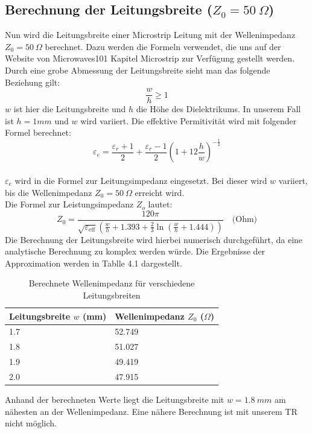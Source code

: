     \subsection{\texorpdfstring{Berechnung der Leitungsbreite ($Z_0 = 50~\Omega$)}{Berechnung der Leitungsbreite (Z0 = 50 Ohm)}}
    Nun wird die Leitungsbreite einer Microstrip Leitung mit der Wellenimpedanz $Z_0 = 50~\Omega$ berechnet.
    Dazu werden die Formeln verwendet, die uns auf der Website von Microwaves101 Kapitel Microstrip zur
    Verfügung gestellt werden. Durch eine grobe Abmessung der Leitungsbreite sieht man das folgende Beziehung gilt: \\
    \[
    \frac{w}{h} \geq 1
    \]
    $w$ ist hier die Leitungsbreite und $h$ die Höhe des Dielektrikums. In unserem Fall ist $h = 1mm$ und $w$ wird variiert. Die 
    effektive Permitivität wird mit folgender Formel berechnet:
      \[
    \varepsilon_e = \frac{\varepsilon_r + 1}{2} + \frac{\varepsilon_r - 1}{2} \left( 1 + 12 \frac{h}{w} \right)^{-\frac{1}{2}}
    \]
   \\ $\varepsilon_e$ wird in die Formel zur Leitungsimpedanz eingesetzt. Bei dieser wird $w$
    variiert, bis die Wellenimpedanz $Z_0 = 50~\Omega$ erreicht wird.
    \\
    Die Formel zur Leistungsimpedanz $Z_o$ lautet:
    \[
    Z_0 = \frac{120 \pi}{\sqrt{\varepsilon_{\text{eff}}} \left( \frac{w}{h} + 1.393 + \frac{2}{3} \ln\left( \frac{w}{h} + 1.444 \right) \right)} \quad \text{(Ohm)}
    \]
    Die Berechnung der Leitungsbreite wird hierbei numerisch durchgeführt, da eine analytische Berechnung zu
    komplex werden würde. Die Ergebnisse der Approximation werden in Tablle 4.1 dargestellt. \\
    
    \begin{table}[H]
        \centering
        \begin{tabular}{|l|l|}
            \hline
            \textbf{Leitungsbreite $w$ (mm)} & \textbf{Wellenimpedanz $Z_0$ ($\Omega$)} \\
            \hline
            1.7 & 52.749 \\
            1.8 & 51.027 \\
            1.9 & 49.419 \\
            2.0 & 47.915 \\
           
            \hline
        \end{tabular}
        \caption{Berechnete Wellenimpedanz für verschiedene Leitungsbreiten}
    \end{table}
    Anhand der berechneten Werte liegt die Leitungsbreite mit $w = 1.8~mm$ am nähesten an der Wellenimpedanz.
    Eine nähere Berechnung ist mit unserem TR nicht möglich. 

